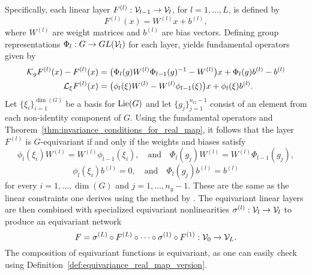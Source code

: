 \documentclass[twoside,11pt]{article}
\begin{document}
Specifically, each linear layer $F^{(l)}: {\mathcal{V}}_{l-1} \to {\mathcal{V}}_l$, for $l=1,\ldots,L$, is defined by
\begin{equation}
    F^{(l)}(x) = W^{(l)} x + b^{(l)},
\end{equation}
where $W^{(l)}$ are weight matrices and $b^{(l)}$ are bias vectors.
Defining group representations $\Phi_l: G \to GL({\mathcal{V}}_l)$ for each layer, yields fundamental operators given by
\begin{align}
    {\mathcal{K}}_{g} F^{(l)}(x) - F^{(l)}(x) 
    &= \big( \Phi_{l}(g) W^{(l)} \Phi_{l-1}(g)^{-1} - W^{(l)} \big) x + \Phi_{l}(g) b^{(l)} - b^{(l)} \\
    {\mathcal{L}}_{\xi} F^{(l)}(x) 
    &= \big(\phi_{l}(\xi) W^{(l)} - W^{(l)} \phi_{l-1}(\xi)\big) x +  \phi_{l}(\xi) b^{(l)}.
\end{align}
Let $\{ \xi_i \}_{i=1}^{\dim(G)}$ be a basis for $\operatorname{Lie}(G)$ and let $\{g_j\}_{j=1}^{n_G - 1}$ consist of an element from each non-identity component of $G$.
Using the fundamental operators and Theorem~\ref{thm:invariance_conditions_for_real_map}, it follows that the layer $F^{(l)}$ is $G$-equivariant if and only if the weights and biases satisfy 
\begin{equation}
    \phi_{l}(\xi_i) W^{(l)} = W^{(l)} \phi_{l-1}(\xi_i), 
    \quad \mbox{and} \quad
    \Phi_{l}(g_j) W^{(l)} = W^{(l)} \Phi_{l-1}(g_j),
\end{equation}
\begin{equation}
    \phi_{l}(\xi_i) b^{(l)} = 0,
    \quad \mbox{and} \quad
    \Phi_{l}(g_j) b^{(l)} = b^{(l)}
\end{equation}
for every $i = 1, \ldots,\dim(G)$ and $j = 1, \ldots, n_g-1$.
These are the same as the linear constraints one derives using the method by \cite{Finzi2021practical}.
The equivariant linear layers are then combined with specialized equivariant nonlinearities $\sigma^{(l)}: {\mathcal{V}}_l \to {\mathcal{V}}_l$
to produce an equivariant network
\begin{equation}
    F = \sigma^{(L)} \circ F^{(L)} 
    \circ \cdots \circ 
    \sigma^{(1)} \circ F^{(1)}: {\mathcal{V}}_0 \to {\mathcal{V}}_L.
\end{equation}
The composition of equivariant functions is equivariant, as one can easily check using Definition~\ref{def:equivariance_real_map_version}.
\end{document}
